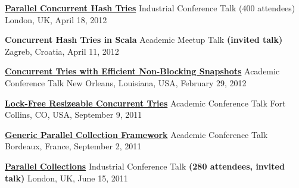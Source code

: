 \documentclass[9pt]{article}
\begin{document}
\begin{easylist}[itemize]
\noindent\href{https://skillsmatter.com/skillscasts/3234-parallel-concurrent-hash-tries}
{\bf Parallel Concurrent Hash Tries}
\vspace{-0.03in}
\newline\noindent Industrial Conference Talk (400 attendees)
\dates{}
\linebreak\noindent London, UK, April 18, 2012
\bigskip

\noindent
{\bf Concurrent Hash Tries in Scala}
\vspace{-0.03in}
\newline\noindent Academic Meetup Talk \textbf{(invited talk)}
\dates{}
\linebreak\noindent Zagreb, Croatia, April 11, 2012
\bigskip

\noindent\href{http://axel22.github.io/resources/docs/ctries-snapshots.pptx}
{\bf Concurrent Tries with Efficient Non-Blocking Snapshots}
\vspace{-0.03in}
\newline\noindent Academic Conference Talk
\dates{}
\linebreak\noindent New Orleans, Louisiana, USA, February 29, 2012
\bigskip

\noindent
\href{http://lcpc11.cs.colostate.edu/}
{\bf Lock-Free Resizeable Concurrent Tries}
\vspace{-0.03in}
\newline\noindent Academic Conference Talk
\dates{}
\linebreak\noindent Fort Collins, CO, USA, September 9, 2011
\bigskip

\noindent
\href{http://europar2011.bordeaux.inria.fr/conference.php}
{\bf Generic Parallel Collection Framework}
\vspace{-0.03in}
\newline\noindent Academic Conference Talk
\dates{}
\linebreak\noindent Bordeaux, France, September 2, 2011
\bigskip

\noindent\href{https://skillsmatter.com/skillscasts/2236-parallel-collections}
{\bf Parallel Collections}
\vspace{-0.03in}
\newline\noindent Industrial Conference Talk \textbf{(280 attendees, invited talk)}
\dates{}
\linebreak\noindent London, UK, June 15, 2011
\bigskip


\end{easylist}
\end{document}
